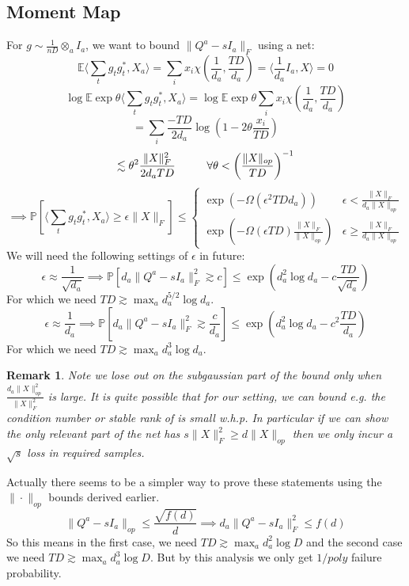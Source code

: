 \documentclass{article}
\newtheorem{remark}{Remark}
\newcommand{\E}{\mathbb{E}}
\renewcommand{\Pr}{\mathbb{P}}
\begin{document}
\subsection{Moment Map}
For $g \sim \frac{1}{nD} \otimes_{a} I_{a}$, we want to bound $\|Q^{a} - sI_{a}\|_{F}$ using a net:
\[ \E \langle \sum_{t} g_{t} g_{t}^{*}, X_{a} \rangle = \sum_{i} x_{i} \chi(\frac{1}{d_{a}}, \frac{TD}{d_{a}}) = \langle \frac{1}{d_{a}} I_{a}, X \rangle = 0 \]
\[ \log \E \exp \theta \langle \sum_{t} g_{t} g_{t}^{*}, X_{a} \rangle = \log \E \exp \theta \sum_{i} x_{i} \chi(\frac{1}{d_{a}}, \frac{TD}{d_{a}})  \]
\[ = \sum_{i} \frac{-TD}{2 d_{a}} \log \left( 1 - 2 \theta \frac{x_{i}}{TD} \right)   \]
\[ \lesssim \theta^{2} \frac{\|X\|_{F}^{2}}{2 d_{a} TD} \hspace{10mm} \forall \theta < \left( \frac{\|X\|_{op}}{TD} \right)^{-1}  \]
\[ \implies \Pr[ \langle \sum_{t} g_{t} g_{t}^{*}, X_{a} \rangle \geq \epsilon \|X\|_{F} ] \leq
\begin{cases}
\exp( - \Omega(\epsilon^{2} TD d_{a}) ) & \epsilon  < \frac{\|X\|_{F}}{d_{a} \|X\|_{op}}
\\ \exp ( - \Omega(\epsilon TD) \frac{\|X\|_{F}}{\|X\|_{op}} ) & \epsilon \geq \frac{\|X\|_{F}}{d_{a} \|X\|_{op}}
\end{cases}
\]
We will need the following settings of $\epsilon$ in future:
\[ \epsilon \approx \frac{1}{\sqrt{d_{a}}} \implies \Pr [ d_{a} \|Q^{a} - sI_{a}\|_{F}^{2} \gtrsim c ] \leq \exp(d_{a}^{2} \log d_{a} - c \frac{TD}{\sqrt{d_{a}}})  \]
For which we need $TD \gtrsim \max_{a} d_{a}^{5/2} \log d_{a}$.
\[ \epsilon \approx \frac{1}{d_{a}} \implies \Pr [ d_{a} \|Q^{a} - sI_{a}\|_{F}^{2} \gtrsim \frac{c}{d_{a}} ] \leq \exp(d_{a}^{2} \log d_{a} - c^{2} \frac{TD}{d_{a}})   \]
For which we need $TD \gtrsim \max_{a} d_{a}^{3} \log d_{a}$.

\begin{remark}
Note we lose out on the subgaussian part of the bound only when $\frac{d_{a} \|X\|_{op}^{2}}{\|X\|_{F}^{2}}$ is large. It is quite possible that for our setting, we can bound e.g. the condition number or stable rank of is small w.h.p. In particular if we can show the only relevant part of the net has $s \|X\|_{F}^{2} \geq d \|X\|_{op}$ then we only incur a $\sqrt{s}$ loss in required samples.
\end{remark}

Actually there seems to be a simpler way to prove these statements using the $\|\cdot\|_{op}$ bounds derived earlier.
\[ \|Q^{a} - sI_{a}\|_{op} \leq \frac{\sqrt{f(d)}}{d} \implies d_{a} \|Q^{a} - sI_{a}\|_{F}^{2} \leq f(d)  \]
So this means in the first case, we need $TD \gtrsim \max_{a} d_{a}^{2} \log D$ and the second case we need $TD \gtrsim \max_{a} d_{a}^{3} \log D$. But by this analysis we only get $1/poly$ failure probability.
\end{document}
